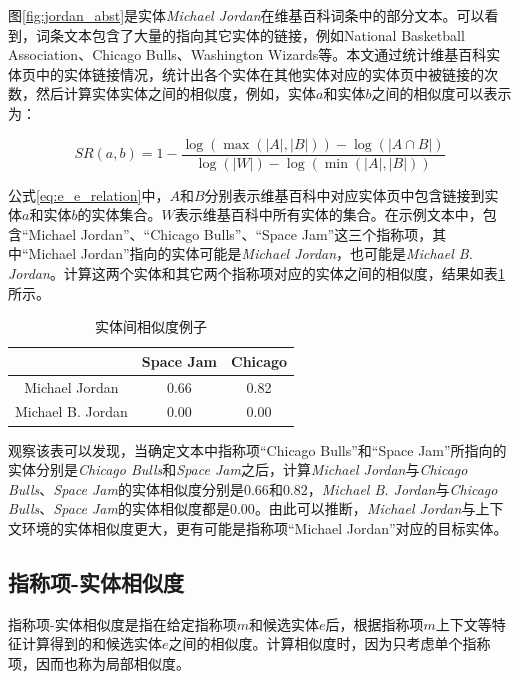 图\ref{fig:jordan_abst}是实体\textit{Michael Jordan}在维基百科词条中的部分文本。可以看到，词条文本包含了大量的指向其它实体的链接，例如National Basketball Association、Chicago Bulls、Washington Wizards等。本文通过统计维基百科实体页中的实体链接情况，统计出各个实体在其他实体对应的实体页中被链接的次数，然后计算实体实体之间的相似度，例如，实体$a$和实体$b$之间的相似度可以表示为：

\begin{equation}\label{eq:e_e_relation}
SR(a,b)=1-\frac{\log (\max(|A|,|B|))-\log(|A\cap B|)}{\log(|W|)-\log(\min(|A|,|B|))}
\end{equation}

公式\ref{eq:e_e_relation}中，$A$和$B$分别表示维基百科中对应实体页中包含链接到实体$a$和实体$b$的实体集合。$W$表示维基百科中所有实体的集合。在示例文本中，包含“Michael Jordan”、“Chicago Bulls”、“Space Jam”这三个指称项，其中“Michael Jordan”指向的实体可能是\textit{Michael Jordan}，也可能是\textit{Michael B. Jordan}。计算这两个实体和其它两个指称项对应的实体之间的相似度，结果如表\ref{tab:ee_relation_example}所示。

\begin{table}[!htb]
	\caption{实体间相似度例子\label{tab:ee_relation_example}}
	\centering
	\begin{tabular}{|c|c|c|}
		\hline
		 & Space Jam & Chicago\\
		\hline
		Michael Jordan & 0.66 & 0.82\\
		\hline
		Michael B. Jordan & 0.00 & 0.00\\
		\hline
	\end{tabular}
\end{table}

观察该表可以发现，当确定文本中指称项“Chicago Bulls”和“Space Jam”所指向的实体分别是\textit{Chicago Bulls}和\textit{Space Jam}之后，计算\textit{Michael Jordan}与\textit{Chicago Bulls}、\textit{Space Jam}的实体相似度分别是$0.66$和$0.82$，\textit{Michael B. Jordan}与\textit{Chicago Bulls}、\textit{Space Jam}的实体相似度都是$0.00$。由此可以推断，\textit{Michael Jordan}与上下文环境的实体相似度更大，更有可能是指称项“Michael Jordan”对应的目标实体。

\subsection{指称项-实体相似度}\label{section:me_relation}
指称项-实体相似度是指在给定指称项$m$和候选实体$e$后，根据指称项$m$上下文等特征计算得到的和候选实体$e$之间的相似度。计算相似度时，因为只考虑单个指称项，因而也称为局部相似度。

